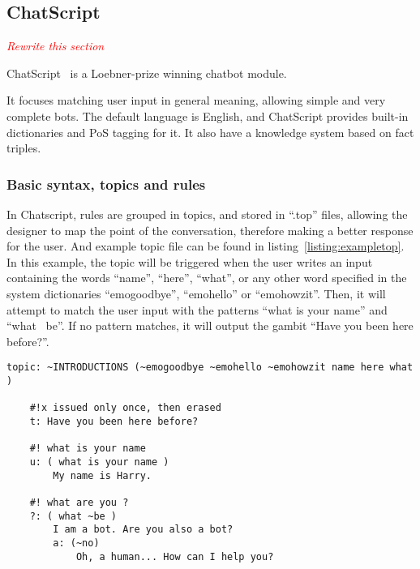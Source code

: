 \subsection{ChatScript}
\label{subsec:chatscript}

\emph{\textcolor{red}{Rewrite this section}}

ChatScript~\cite{wilcox2013} is a Loebner-prize winning chatbot module.

It focuses matching user input in general meaning, allowing simple and very complete bots. The default language is English, and ChatScript provides built-in dictionaries and \ac{PoS} tagging for it. It also have a knowledge system based on fact triples.

\subsubsection{Basic syntax, topics and rules}

In Chatscript, rules are grouped in topics, and stored in ``.top'' files, allowing the designer to map the point of the conversation, therefore making a better response for the user. And example topic file can be found in listing~\ref{listing:exampletop}. In this example, the topic will be triggered when the user writes an input containing the words ``name'', ``here'', ``what'', or any other word specified in the system dictionaries ``emogoodbye'', ``emohello'' or ``emohowzit''. Then, it will attempt to match the user input with the patterns ``what is your name'' and ``what ~be''. If no pattern matches, it will output the gambit ``Have you been here before?''.

\begin{center} 
  \begin{lstlisting}[language={}, captionpos=b, caption=Example topic file, label=listing:exampletop]   
    topic: ~INTRODUCTIONS (~emogoodbye ~emohello ~emohowzit name here what )
    
    #!x issued only once, then erased
    t: Have you been here before?
    
    #! what is your name 
    u: ( what is your name ) 
        My name is Harry.
        
    #! what are you ?
    ?: ( what ~be )
        I am a bot. Are you also a bot?
        a: (~no)
            Oh, a human... How can I help you?
  \end{lstlisting}
\end{center}

